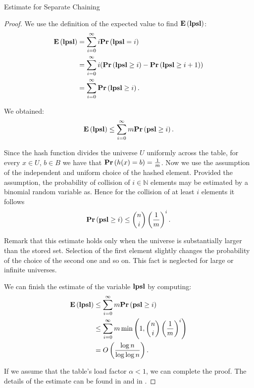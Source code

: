 \begin{section}{Estimate for Separate Chaining}
\begin{proof}
We use the definition of the expected value to find $\mathbf{E}\left(\mathbf{lpsl}\right)$:
\begin{displaymath}
\begin{split}
\mathbf{E}\left(\mathbf{lpsl}\right)
	& = \displaystyle \sum_{i=0}^{\infty} i \mathbf{Pr}\left(\mathbf{lpsl} = i\right) \\
	& = \displaystyle \sum_{i = 0}^{\infty} i (\mathbf{Pr}\left(\mathbf{lpsl} \geq i\right) - \mathbf{Pr}\left(\mathbf{lpsl} \geq i + 1\right)) \\ 
	& = \displaystyle \sum_{i = 0}^{\infty} \mathbf{Pr}\left(\mathbf{lpsl} \geq i\right) \text{.}
\end{split}
\end{displaymath}

We obtained:
\begin{displaymath}
\mathbf{E}\left(\mathbf{lpsl}\right) \leq \displaystyle \sum_{i = 0}^{\infty} m \mathbf{Pr}\left(\mathbf{psl} \geq i\right) \text{.}
\end{displaymath}

Since the hash function divides the universe $U$ uniformly across the table, for every $x \in U$, $b \in B$ we have that $\mathbf{Pr}\left(h(x) = b\right) = \frac{1}{m}$. Now we use the assumption of the independent and uniform choice of the hashed element. Provided the assumption, the probability of collision of $i \in \mathbb{N}$ elements may be estimated by a binomial random variable as. Hence for the collision of at least $i$ elements it follows
\begin{displaymath}
\mathbf{Pr}\left(\mathbf{psl} \geq i\right) \leq \dbinom{n}{i}\left(\frac{1}{m}\right)^i \text{.}
\end{displaymath}

Remark that this estimate holds only when the universe is substantially larger than the stored set. Selection of the first element slightly changes the probability of the choice of the second one and so on. This fact is neglected for large or infinite universes.

We can finish the estimate of the variable $\mathbf{lpsl}$ by computing:
\begin{displaymath}
\begin{split}
\mathbf{E}\left(\mathbf{lpsl}\right)	& \leq \displaystyle \sum_{i = 0}^{\infty} m \mathbf{Pr}\left(\mathbf{psl} \geq i\right) \\
		& \leq \displaystyle \sum_{i = 0}^{\infty} m \min\left(1, \dbinom{n}{i}\left(\frac{1}{m}\right)^i\right) \\
		& = O\left(\frac{\log n}{\log \log n}\right) \text{.}
\end{split}
\end{displaymath}

If we assume that the table's load factor $\alpha < 1$, we can complete the proof. The details of the estimate can be found in \cite{DBLP:books/sp/Mehlhorn84} and in \cite{VK-skripta}.
\end{proof}
\end{section}

